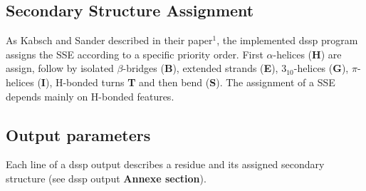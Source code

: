 \documentclass[12pt]{article}
\begin{document}
\subsection{Secondary Structure Assignment}
As Kabsch and Sander described in their paper$^1$, the implemented dssp program assigns the SSE according to a specific priority order. First $\alpha$-helices (\textbf{H}) are assign, follow by isolated $\beta$-bridges (\textbf{B}), extended strands (\textbf{E}), $\textrm{3}_\textrm{10}$-helices (\textbf{G}), $\pi$-helices (\textbf{I}), H-bonded turns \textbf{T} and then bend (\textbf{S}). The assignment of a SSE depends mainly on H-bonded features.

\subsection{Output parameters}
Each line of a dssp output describes a residue and its assigned secondary structure (see dssp output \textbf{Annexe section}).\\
\end{document}
